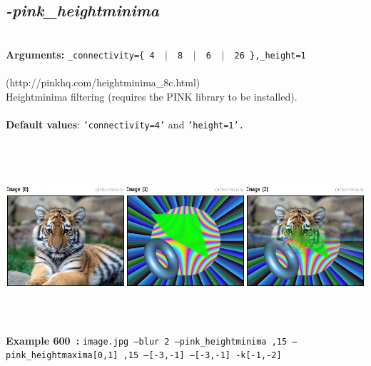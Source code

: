 \documentclass[a4paper,11pt,twoside]{book}
\begin{document}
\subsection{\emph{-pink\_heightminima} }\vspace*{-0.5em}
~\\\textbf{Arguments: } 
{\small \texttt{\_connectivity=\{ 4 ~$|$~ 8 ~$|$~ 6 ~$|$~ 26 \},\_height=1}}\\~\\
(http://pinkhq.com/heightminima\_8c.html)
~\\Heightminima filtering (requires the PINK library to be installed).
~\\~\\\textbf{Default values}: {\small \texttt{'connectivity=4'} and \texttt{'height=1'.}}
\begin{center}\includegraphics[keepaspectratio=true,height=7cm,width=\textwidth]{img/gmic_def600.jpg}\\
{\footnotesize \textbf{Example 600~:} \texttt{image.jpg --blur 2 --pink\_heightminima ,15 --pink\_heightmaxima[0,1] ,15 --[-3,-1] --[-3,-1] -k[-1,-2]}}
\end{center}
\end{document}
